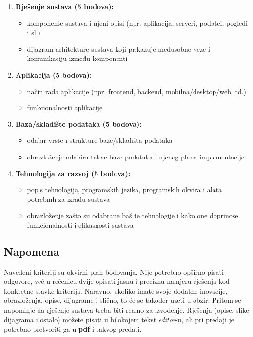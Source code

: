 \documentclass{article}
\begin{document}
\begin{enumerate}
    \item \textbf{Rješenje sustava (5 bodova):}
    \begin{itemize}
        \item komponente sustava i njeni opisi (npr. aplikacija, serveri, podatci, pogledi i sl.)
        \item dijagram arhitekture sustava koji prikazuje međusobne veze i komunikaciju između komponenti
    \end{itemize}
    
    \item \textbf{Aplikacija (5 bodova):}
    \begin{itemize}
        \item način rada aplikacije (npr. frontend, backend, mobilna/desktop/web itd.)
        \item funkcionalnosti aplikacije
    \end{itemize}
    
    \item \textbf{Baza/skladište podataka (5 bodova):}
    \begin{itemize}
        \item odabir vrste i strukture baze/skladišta podataka
        \item obrazloženje odabira takve baze podataka i njenog plana implementacije
    \end{itemize}
    
    \item \textbf{Tehnologija za razvoj (5 bodova):}
    \begin{itemize}
        \item popis tehnologija, programskih jezika, programskih okvira i alata potrebnih za izradu sustava
        \item obrazloženje zašto su odabrane baš te tehnologije i kako one doprinose funkcionalnosti i efikasnosti sustava
    \end{itemize}
\end{enumerate}

\subsection{Napomena}
Navedeni kriteriji su okvirni plan bodovanja. Nije potrebno opširno pisati odgovore, već u rečenicu-dvije opisati jasnu i preciznu namjeru rješenja kod konkretne stavke kriterija. Naravno, ukoliko imate svoje dodatne inovacije, obrazloženja, opise, dijagrame i slično, to će se također uzeti u obzir. Pritom se napominje da rješenje sustava treba biti realno za izvođenje. Rješenja (opise, slike dijagrama i ostalo) možete pisati u bilokojem tekst \textit{editor}-u, ali pri predaji je potrebno pretvoriti ga u \textbf{pdf} i takvog predati.
\end{document}
